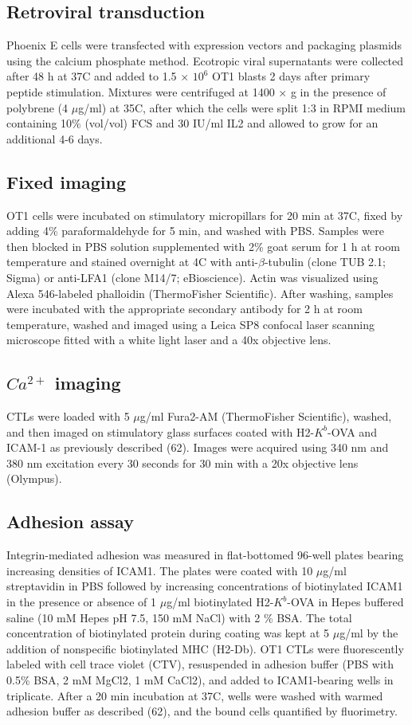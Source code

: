 \subsection{Retroviral transduction}
Phoenix E cells were transfected with expression vectors and packaging plasmids using the calcium phosphate method. Ecotropic viral supernatants were collected after 48 h at 37\degree C and added to 1.5 × $10^{6}$ OT1 blasts 2 days after primary peptide stimulation. Mixtures were centrifuged at 1400 × g in the presence of polybrene (4 $\mu$g/ml) at 35\degree C, after which the cells were split 1:3 in RPMI medium containing 10\% (vol/vol) FCS and 30 IU/ml IL2 and allowed to grow for an additional 4-6 days.

\subsection{Fixed imaging}
OT1 cells were incubated on stimulatory micropillars for 20 min at 37\degree C, fixed by adding 4\% paraformaldehyde for 5 min, and washed with PBS. Samples were then blocked in PBS solution supplemented with 2\% goat serum for 1 h at room temperature and stained overnight at 4\degree C with anti-$\beta$-tubulin (clone TUB 2.1; Sigma) or anti-LFA1 (clone M14/7; eBioscience). Actin was visualized using Alexa 546-labeled phalloidin (ThermoFisher Scientific). After washing, samples were incubated with the appropriate secondary antibody for 2 h at room temperature, washed and imaged using a Leica SP8 confocal laser scanning microscope fitted with a white light laser and a 40x objective lens.

\subsection{$Ca^{2+}$ imaging}
CTLs were loaded with 5 $\mu$g/ml Fura2-AM (ThermoFisher Scientific), washed, and then imaged on stimulatory glass surfaces coated with H2-$K^{b}$-OVA and ICAM-1 as previously described (62). Images were acquired using 340 nm and 380 nm excitation every 30 seconds for 30 min with a 20x objective lens (Olympus).

\subsection{Adhesion assay}
Integrin-mediated adhesion was measured in flat-bottomed 96-well plates bearing increasing densities of ICAM1. The plates were coated with 10 $\mu$g/ml streptavidin in PBS followed by increasing concentrations of biotinylated ICAM1 in the presence or absence of 1 $\mu$g/ml biotinylated H2-$K^{b}$-OVA in Hepes buffered saline (10 mM Hepes pH 7.5, 150 mM NaCl) with 2 \% BSA. The total concentration of biotinylated protein during coating was kept at 5 $\mu$g/ml by the addition of nonspecific biotinylated MHC (H2-Db). OT1 CTLs were fluorescently labeled with cell trace violet (CTV), resuspended in adhesion buffer (PBS with 0.5\% BSA, 2 mM MgCl2, 1 mM CaCl2), and added to ICAM1-bearing wells in triplicate. After a 20 min incubation at 37\degree C, wells were washed with warmed adhesion buffer as described (62), and the bound cells quantified by fluorimetry.

